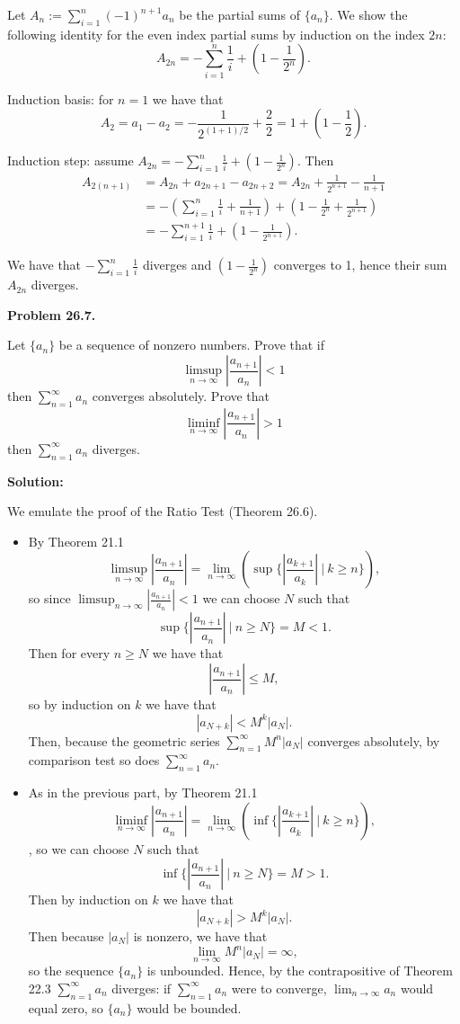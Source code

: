 \documentclass[12pt]{article}
\def\black{\color{black}}
\def\green{\color{rltgreen}}
\newcommand\bi{\begin{itemize}}
\newcommand\ei{\end{itemize}}
\newcommand\itema{\item[(a)]}
\newcommand\itemb{\item[(b)]}
\renewcommand\|{\ | \ }
\newcommand\ra{\rightarrow}
\def\pb#1{{\green \bf Problem #1.}\hskip 8pt \black}
\def\sol{\textbf{Solution:}}
\def\sequence#1{$\{{#1}_n\}$}
\def\sumint#1{\sum_{#1=1}^\infty}
\def\sumseries#1#2{$\sumint#1 #2_{#1}$}
\newcommand\limn{\lim_{n \ra \infty}}
\newcommand\limsupn{\limsup_{n \ra \infty}}
\newcommand\liminfn{\liminf_{n \ra \infty}}
\begin{document}
Let $A_n := \sum_{i=1}^n (-1)^{n+1} a_n$ be the partial sums of \sequence a. 
We show the following identity for the even index partial sums by induction 
on the index $2n$:
\[
A_{2n} = -\sum_{i = 1}^n \frac 1 i + \left(1 - \frac 1 {2^n}\right).
\]

Induction basis: for $n = 1$ we have that
\[
A_2 = a_1 - a_2 = -\frac 1 {2^{(1 + 1)/2}} + \frac 2 2 =
	1 + \left(1 - \frac 1 2\right).
\]

Induction step: assume 
$A_{2n} = -\sum_{i = 1}^n \frac 1 i + \left(1 - \frac 1 {2^n}\right)$. 
Then
\begin{align*}
A_{2(n + 1)} 
& = A_{2n} + a_{2n + 1} - a_{2n + 2}
	= A_{2n} + \frac 1 {2^{n + 1}} - \frac 1 {n + 1} \\
& =  - \left(\sum_{i = 1}^n \frac 1 i + \frac 1 {n + 1}\right) 
	+ \left(1 - \frac 1 {2^n} + \frac 1 {2^{n + 1}}\right) \\
& = - \sum_{i = 1}^{n + 1} \frac 1 i + \left(1 - \frac 1 {2^{n + 1}}\right).
\end{align*}

We have that $-\sum_{i = 1}^n \frac 1 i$ diverges and 
$\left(1 - \frac 1 {2^n}\right)$ converges to 1, hence their sum $A_{2n}$
diverges.

\pb {26.7}

Let \sequence a be a sequence of nonzero numbers. Prove that if
\[
\limsupn \left| \frac {a_{n + 1}}{a_n} \right| < 1
\]
then \sumseries n a converges absolutely. Prove that 
\[
\liminfn \left| \frac {a_{n + 1}}{a_n} \right| > 1
\]
then \sumseries n a diverges.

\sol

We emulate the proof of the Ratio Test (Theorem 26.6).
\bi
\itema
By Theorem 21.1
\[
\limsupn \left| \frac {a_{n + 1}}{a_n} \right|
	= \limn (\sup\{\left| \frac {a_{k + 1}}{a_k} \right| \| k \geq n\}),
\]
so since $\limsupn \left| \frac {a_{n + 1}}{a_n} \right| < 1$ we can
choose $N$ such that 
\[
\sup\{\left| \frac {a_{n + 1}}{a_n} \right| \| n \geq N\} = M < 1.
\]
Then for every $n \geq N$ we have that
\[
\left| \frac {a_{n + 1}}{a_n} \right| \leq M,
\]
so by induction on $k$ we have that
\[
|a_{N + k}| < M^k |a_N|.
\]
Then, because the geometric series $\sumint n M^n |a_N|$ converges
absolutely, by comparison test so does \sumseries n a.
\itemb
As in the previous part, by Theorem 21.1
\[
\liminfn \left| \frac {a_{n + 1}}{a_n} \right|
	= \limn (\inf\{\left| \frac {a_{k + 1}}{a_k} \right| \| k \geq n\}),
\],
so we can choose $N$ such that 
\[
\inf\{\left| \frac {a_{n + 1}}{a_n} \right| \| n \geq N\} = M > 1.
\]
Then by induction on $k$ we have that
\[
|a_{N + k}| > M^k |a_N|.
\]
Then because $|a_N|$ is nonzero, we have that 
\[
\limn M^n |a_N| = \infty,
\]
so the sequence \sequence a is unbounded. Hence, by the contrapositive
of Theorem 22.3 \sumseries n a diverges: if \sumseries n a were to 
converge, $\limn a_n$ would equal zero, so \sequence a would be bounded.
\ei
\end{document}
